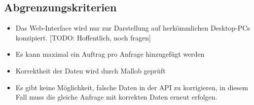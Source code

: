 \subsection{Abgrenzungskriterien}
    \begin{itemize}
        \item Das Web-Interface wird nur zur Darstellung auf herkömmlichen Desktop-PCs konzipiert. [TODO: Hoffentlich, noch fragen]
        \item Es kann maximal ein Auftrag pro Anfrage hinzugefügt werden 
        \item Korrektheit der Daten wird durch Mallob geprüft
        \item Es gibt keine Möglichkeit, falsche Daten in der API zu korrigieren, in diesem Fall muss die gleiche Anfrage mit korrekten Daten erneut erfolgen.
    \end{itemize}
